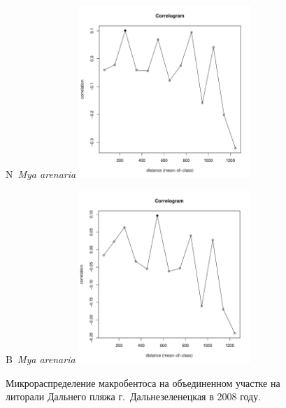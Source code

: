 \documentclass[12pt, a4paper]{disser}
\begin{document}
\begin{figure}[h]
	\begin{minipage}[b]{.46\linewidth}
	\begin{center}
	{\small N~{\it Mya arenaria}}
		\includegraphics[width=65mm]{../Barenc_Sea/distribution_Moran/Plyazh0812_moran_N_Mya_arenaria_.pdf}
	\end{center}
	\end{minipage}
%
	\hfil %
%
	\begin{minipage}[b]{.46\linewidth}
	\begin{center}
	{\small B~{\it Mya arenaria}}
		\includegraphics[width=65mm]{../Barenc_Sea/distribution_Moran/Plyazh0812_moran_B_Mya_arenaria_.pdf}
	\end{center}
	\end{minipage}



	\caption{Микрораспределение макробентоса на объединенном участке на литорали Дальнего пляжа г.~Дальнезеленецкая в 2008 году.}
	\label{ris:moransI_Plyazh0812_1}
	\end{figure}
\end{document}
